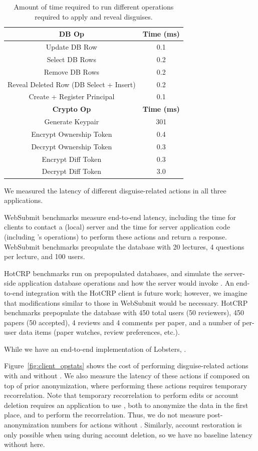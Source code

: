 \begin{table}[h!]
\begin{center}
\begin{tabular}{ c c }
\hline
\textbf{DB Op} & \textbf{Time (ms)}\\
\hline
Update DB Row & 0.1\\ 
Select DB Rows & 0.2\\
Remove DB Rows & 0.2\\
Reveal Deleted Row (DB Select + Insert) & 0.2 \\
Create + Register Principal & 0.1\\
\hline
\textbf{Crypto Op} & \textbf{Time (ms)}\\
\hline
Generate Keypair & 301\\
Encrypt Ownership Token & 0.4\\
Decrypt Ownership Token & 0.3\\
Encrypt Diff Token & 0.3\\
Decrypt Diff Token & 3.0\\
\end{tabular}
\end{center}
\caption{Amount of time required to run different operations required to apply and reveal disguises.}
\label{tab:opstats}
\end{table}

We measured the latency of different disguise-related actions in all three applications.

WebSubmit benchmarks measure end-to-end latency, including the time for clients to contact a (local)
server and the time for server application code (including \sys's operations) to perform these
actions and return a response.
%
WebSubmit benchmarks preopulate the database with 20 lectures, 4 questions per lecture, and 100
users.

HotCRP benchmarks run on prepopulated databases, and simulate the server-side application database
operations and how the server would invoke \sys.  An end-to-end integration with the HotCRP client
is future work; however, we imagine that modifications similar to those in WebSubmit would be
necessary.
%
HotCRP benchmarks prepopulate the database with 450 total users (50 reviewers), 450 papers (50
accepted), 4 reviews and 4 comments per paper, and a number of per-user data items (\eg paper
watches, review preferences, etc.).  

While we have an end-to-end implementation of Lobsters, .

%
%
Figure~\ref{fig:client_opstats} shows the cost of performing disguise-related actions with and
without \sys. We also measure the latency of these actions if composed on top of prior
anonymization, where performing these actions requires temporary recorrelation.
Note that temporary recorrelation to perform edits or account deletion requires an
application to use \sys, both to anonymize the data in the first place, and to perform the 
recorrelation. Thus, we do not measure post-anonymization numbers for actions without \sys. Similarly,
account restoration is only possible when using \sys during account deletion, so we have
no baseline latency without \sys here.

